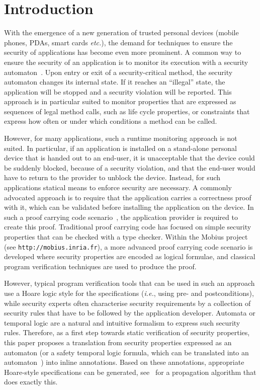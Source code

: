 \section{Introduction}\label{SecIntro}

With the emergence of a new generation of trusted personal devices
(mobile phones, PDAs, smart cards \emph{etc.}), the demand for
techniques to ensure the security of applications has become even more
prominent. A common way to ensure the security of an application is to
monitor its execution with a security automaton~\cite{Schneider99}.
Upon entry or exit of a security-critical method, the security
automaton changes its internal state. If it reaches an ``illegal''
state, the application will be stopped and a security violation will
be reported. This approach is in particular suited to monitor
properties that are expressed as sequences of legal method calls, such
as life cycle properties, or constraints that express how often or
under which conditions a method can be called.

However, for many applications, such a runtime monitoring approach is
not suited. In particular, if an application is installed on a
stand-alone personal device that is handed out to an end-user, it is
unacceptable that the device could be suddenly blocked, because of a
security violation, and that the end-user would have to return to the
provider to unblock the device.  Instead, for such applications
statical means to enforce security are necessary. A commonly advocated
approach is to require that the application carries a correctness
proof with it, which can be validated before installing the application
on the device. In such a proof carrying code scenario~\cite{Necula97},
the application provider is required to create this proof. Traditional
proof carrying code has focused on simple security properties that can
be checked with a type checker. Within the
\textsf{Mobius} project (see \texttt{http://mobius.inria.fr}),
a more advanced proof carrying code scenario is developed where
security properties are encoded as logical formulae, and classical
program verification techniques are used to produce the proof.

However, typical program verification tools that can be used in such
an approach use a Hoare logic style for the specifications
(\emph{i.e.}, using pre- and postconditions), while security experts
often characterise security requirements by a collection of security
rules that have to be followed by the application developer. Automata
or temporal logic are a natural and intuitive formalism to express
such security rules. Therefore, as a first step towards static
verification of security properties, this paper proposes a translation
from security properties expressed as an automaton (or a safety
temporal logic formula, which can be translated into an
automaton~\cite{Wolper01}) into inline annotations. Based on these
annotations, appropriate Hoare-style specifications can be generated,
see~\cite{PavlovaBBHL04} for a propagation algorithm that does exactly
this.

